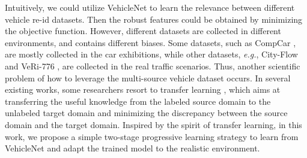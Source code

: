 \documentclass[journal]{IEEEtran}
\def\eg{\emph{e.g.}}
\begin{document}
Intuitively, we could utilize VehicleNet to learn the relevance between different vehicle re-id datasets. Then the robust features could be obtained by minimizing the objective function. However, different datasets are collected in different environments, and contains different biases. Some datasets, such as CompCar \cite{yang2015large}, are mostly collected in the car exhibitions, while other datasets, \eg, City-Flow \cite{tang@cityflow} and VeRi-776 \cite{liu2016deep}, are collected in the real traffic scenarios. Thus, another scientific problem of how to leverage the multi-source vehicle dataset occurs. In several existing works, some researchers resort to transfer learning \cite{pan2009survey}, which aims at transferring the useful knowledge from the labeled source domain to the unlabeled target domain and minimizing the discrepancy between the source domain and the target domain. Inspired by the spirit of transfer learning, in this work, we propose a simple two-stage progressive learning strategy to learn from VehicleNet and adapt the trained model to the realistic environment.
\end{document}
